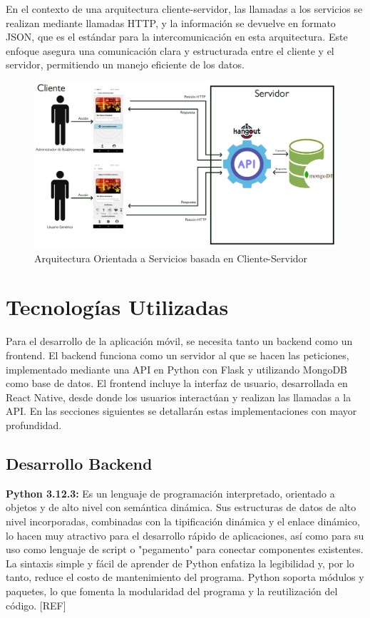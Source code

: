 En el contexto de una arquitectura cliente-servidor, las llamadas a los servicios se realizan mediante llamadas HTTP, y la información se devuelve en formato JSON, que es el estándar para la intercomunicación en esta arquitectura. Este enfoque asegura una comunicación clara y estructurada entre el cliente y el servidor, permitiendo un manejo eficiente de los datos.

\begin{figure}[H]
    \centering
    \includegraphics[width=\textwidth]{imagenes/ARQUITECTURA.jpg}
    \caption{Arquitectura Orientada a Servicios basada en Cliente-Servidor}
    \label{fig:ARQUITECTURA}
\end{figure}


\section{Tecnologías Utilizadas}

Para el desarrollo de la aplicación móvil, se necesita tanto un backend como un frontend. El backend funciona como un servidor al que se hacen las peticiones, implementado mediante una API en Python con Flask y utilizando MongoDB como base de datos. El frontend incluye la interfaz de usuario, desarrollada en React Native, desde donde los usuarios interactúan y realizan las llamadas a la API. En las secciones siguientes se detallarán estas implementaciones con mayor profundidad.

\subsection{Desarrollo Backend}

\textbf{Python 3.12.3:} Es un lenguaje de programación interpretado, orientado a objetos y de alto nivel con semántica dinámica. Sus estructuras de datos de alto nivel incorporadas, combinadas con la tipificación dinámica y el enlace dinámico, lo hacen muy atractivo para el desarrollo rápido de aplicaciones, así como para su uso como lenguaje de script o "pegamento" para conectar componentes existentes. La sintaxis simple y fácil de aprender de Python enfatiza la legibilidad y, por lo tanto, reduce el costo de mantenimiento del programa. Python soporta módulos y paquetes, lo que fomenta la modularidad del programa y la reutilización del código. [REF]


